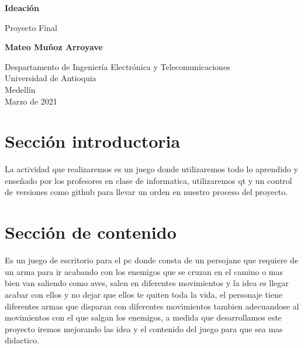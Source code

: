 \documentclass{article}
\begin{document}
\begin{titlepage}
    \begin{center}
        \vspace*{1cm}
            
        \Huge
        \textbf{Ideación}
            
        \vspace{0.5cm}
        \LARGE
        Proyecto Final
            
        \vspace{1.5cm}
            
        \textbf{Mateo Muñoz Arroyave}
            
        \vfill
            
        \vspace{0.8cm}
            
        \Large
        Despartamento de Ingeniería Electrónica y Telecomunicaciones\\
        Universidad de Antioquia\\
        Medellín\\
        Marzo de 2021
            
    \end{center}
\end{titlepage}

\tableofcontents

\section{Sección introductoria}\label{intro}
La actividad que realizaremos es un juego donde utilizaremos todo lo aprendido y enseñado por los profesores en clase de informatica, utilizaremos qt y un control de versiones como github para llevar un orden en nuestro proceso del proyecto.

\section{Sección de contenido} \label{contenido}
Es un juego de escritorio para el pc donde consta de un persojane que requiere de un arma para ir acabando con los enemigos que se cruzan en el camino o mas bien van saliendo como aves, salen en diferentes movimientos y la idea es llegar acabar con ellos y no dejar que ellos te quiten toda la vida, el personaje tiene diferentes armas que disparan con diferentes movimientos tambien adecuandose al movimientos con el que salgan los enemigos, a medida que desarrollamos este proyecto iremos mejorando las idea y el contenido del juego para que sea mas didactico.
\end{document}
